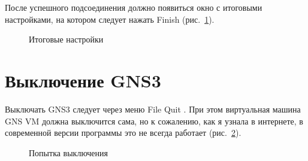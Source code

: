 \documentclass[
  english,
  russian,
  12pt,
  a4paper,
  DIV=11,
  numbers=noendperiod]{scrreprt}
\begin{document}
После успешного подсоединения должно появиться окно с итоговыми
настройками, на котором следует нажать Finish (рис.~\ref{fig-013}).

\begin{figure}


\caption{\label{fig-013}Итоговые настройки}

\end{figure}%

\section{Выключение
GNS3}\label{ux432ux44bux43aux43bux44eux447ux435ux43dux438ux435-gns3}

Выключать GNS3 следует через меню File Quit . При этом виртуальная
машина GNS VM должна выключится сама, но к сожалению, как я узнала в
интернете, в современной версии программы это не всегда работает
(рис.~\ref{fig-014}).

\begin{figure}


\caption{\label{fig-014}Попытка выключения}

\end{figure}%
\end{document}

